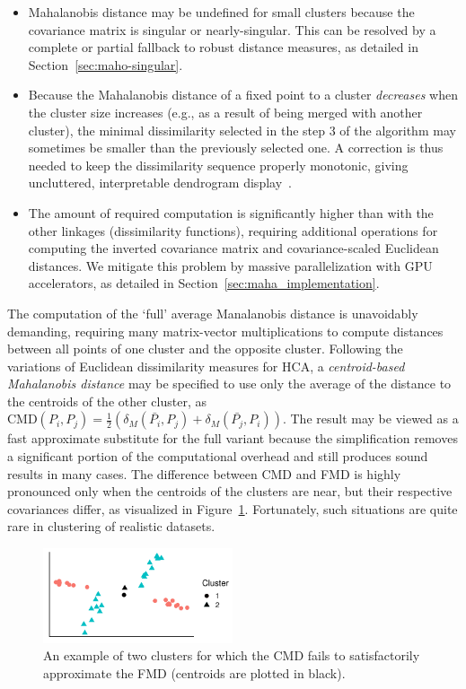 \begin{itemize}
	\item Mahalanobis distance may be undefined for small clusters because the covariance matrix is singular or nearly-singular. This can be resolved by a complete or partial fallback to robust distance measures, as detailed in Section~\ref{sec:maho-singular}.
	\item Because the Mahalanobis distance of a fixed point to a cluster \emph{decreases} when the cluster size increases (e.g., as a result of being merged with another cluster), the minimal dissimilarity selected in the step 3 of the algorithm may sometimes be smaller than the previously selected one.
  A correction is thus needed to keep the dissimilarity sequence properly monotonic, giving uncluttered, interpretable dendrogram display~\cite{everitt2002cambridge}.
	\item The amount of required computation is significantly higher than with the other linkages (dissimilarity functions), requiring additional operations for computing the inverted covariance matrix and covariance-scaled Euclidean distances.
  We mitigate this problem by massive parallelization with GPU accelerators, as detailed in Section~\ref{sec:maha_implementation}.
\end{itemize}

The computation of the `full' average Manalanobis distance is unavoidably demanding, requiring many matrix-vector multiplications to compute distances between all points of one cluster and the opposite cluster.
Following the variations of Euclidean dissimilarity measures for HCA, a \emph{centroid-based Mahalanobis distance} may be specified to use only the average of the distance to the centroids of the other cluster, as $\text{CMD}(P_i, P_j) = \frac{1}{2} \left(\delta_M(\bar{P_i}, P_j) + \delta_M(\bar{P_j}, P_i)\right)$.
The result may be viewed as a fast approximate substitute for the full variant because the simplification removes a significant portion of the computational overhead and still produces sound results in many cases.
The difference between CMD and FMD is highly pronounced only when the centroids of the clusters are near, but their respective covariances differ, as visualized in Figure~\ref{fig:maha_var}.
Fortunately, such situations are quite rare in clustering of realistic datasets.

\begin{figure}[t]
  \centering
	\includegraphics[width=2.2in]{Mahalanobis/img/dists.pdf}
	\caption{An example of two clusters for which the CMD fails to satisfactorily approximate the FMD (centroids are plotted in black).}
	\label{fig:maha_var}
\end{figure}

